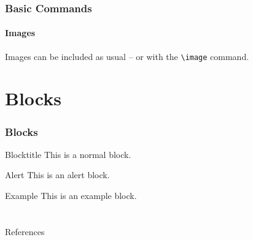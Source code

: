 \documentclass[11pt,\lang ,
compress
]{beamer}
\begin{document}
\begin{frame}
\frametitle{Basic Commands}
\framesubtitle{Images}

Images can be included as usual -- or with the \texttt{\textbackslash image} command.
\end{frame}

\section{Blocks}

\begin{frame}
\frametitle{Blocks}

\begin{block}{Blocktitle}
This is a normal block.
\end{block}

\begin{alertblock}{Alert}
This is an alert block.
\end{alertblock}


\begin{exampleblock}{Example}
   This is an example block.
\end{exampleblock}

\end{frame}

\section*{}
\begin{frame}[allowframebreaks]{References}
\def\newblock{\hskip .11em plus .33em minus .07em}
\scriptsize


\normalsize
\end{frame}

\end{document}
